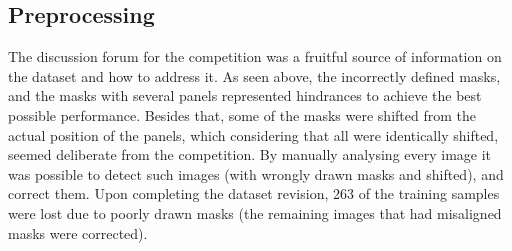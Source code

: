 \documentclass[conference]{IEEEtran}
\begin{document}


\subsection{Preprocessing}

The discussion forum for the competition was a fruitful source of information on the dataset and how to address it. As seen above, the incorrectly defined masks, and the masks with several panels represented hindrances to achieve the best possible performance. Besides that, some of the masks were shifted from the actual position of the panels, which considering that all were identically shifted, seemed deliberate from the competition. By manually analysing every image  it was possible to detect such images (with wrongly drawn masks and shifted), and correct them. Upon completing the dataset revision, 263 of the training samples were lost due to poorly drawn masks (the remaining images that had misaligned masks were corrected).






\end{document}
